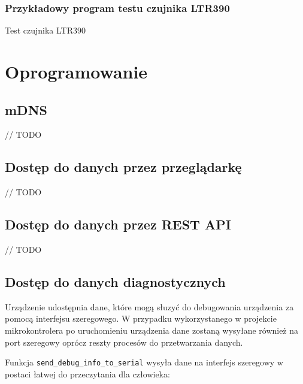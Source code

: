 \documentclass[12pt,a4paper]{article}
\begin{document}
\subsubsection{Przykładowy program testu czujnika LTR390}

\begin{code}[H]

    \caption{Test czujnika LTR390}
\end{code}

\section{Oprogramowanie}

\subsection{mDNS}
// TODO

\subsection{Dostęp do danych przez przeglądarkę}
// TODO

\subsection{Dostęp do danych przez REST API}
// TODO

\subsection{Dostęp do danych diagnostycznych}

Urządzenie udostępnia dane, które mogą słuzyć do debugowania urządzenia za pomocą interfejsu szeregowego. W przypadku wykorzystanego w projekcie
mikrokontrolera po uruchomieniu urządzenia dane zostaną wysyłane również na port szeregowy oprócz reszty procesów do przetwarzania danych.

Funkcja \texttt{send\_debug\_info\_to\_serial} wysyła dane na interfejs szeregowy w postaci łatwej do przeczytania dla człowieka:
\end{document}
